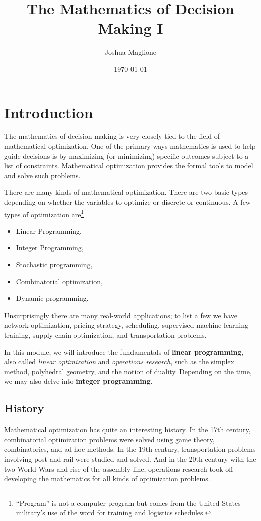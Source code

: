 \documentclass[a4paper, 12pt]{article}
\title{The Mathematics of Decision Making I}
\author{Joshua Maglione}
\date{\today}
\numberwithin{equation}{section}
\numberwithin{figure}{section}
\theoremstyle{definition}
\begin{document}
\maketitle
\tableofcontents

\section{Introduction}

The mathematics of decision making is very closely tied to the field of
mathematical optimization. One of the primary ways mathematics is used to help
guide decisions is by maximizing (or minimizing) specific outcomes subject to a
list of constraints. Mathematical optimization provides the formal tools to
model and solve such problems.

There are many kinds of mathematical optimization. There are two basic types
depending on whether the variables to optimize or discrete or continuous. A few
types of optimization are\footnote{``Program'' is not a computer program but
comes from the United States military's use of the word for training and
logistics schedules.}
\begin{itemize}
	\item Linear Programming,
	\item Integer Programming,
	\item Stochastic programming,
	\item Combinatorial optimization,
	\item Dynamic programming.
\end{itemize}
Unsurprisingly there are many real-world applications; to list a few we have
network optimization, pricing strategy, scheduling, supervised machine learning
training, supply chain optimization, and transportation problems. 

In this module, we will introduce the fundamentals of \textbf{linear
programming}, also called \emph{linear optimization} and \emph{operations
research}, such as the simplex method, polyhedral geometry, and the notion of
duality. Depending on the time, we may also delve into \textbf{integer
programming}.

\subsection{History}

Mathematical optimization has quite an interesting history. In the 17th century,
combinatorial optimization problems were solved using game theory,
combinatorics, and ad hoc methods. In the 19th century, transportation problems
involving post and rail were studied and solved. And in the 20th century with
the two World Wars and rise of the assembly line, operations research took off
developing the mathematics for all kinds of optimization problems. 
\end{document}
